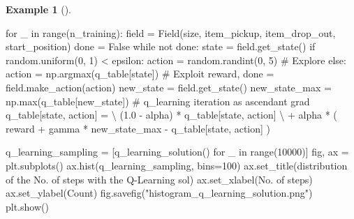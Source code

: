 \documentclass[
  letterpaper,
]{krantz}
\makeatletter
\newenvironment{Shaded}{\begin{snugshade}}{\end{snugshade}}
\newcommand{\BuiltInTok}[1]{\textcolor[rgb]{0.00,0.23,0.31}{#1}}
\newcommand{\CommentTok}[1]{\textcolor[rgb]{0.37,0.37,0.37}{#1}}
\newcommand{\ControlFlowTok}[1]{\textcolor[rgb]{0.00,0.23,0.31}{#1}}
\newcommand{\DecValTok}[1]{\textcolor[rgb]{0.68,0.00,0.00}{#1}}
\newcommand{\FloatTok}[1]{\textcolor[rgb]{0.68,0.00,0.00}{#1}}
\newcommand{\KeywordTok}[1]{\textcolor[rgb]{0.00,0.23,0.31}{#1}}
\newcommand{\NormalTok}[1]{\textcolor[rgb]{0.00,0.23,0.31}{#1}}
\newcommand{\OperatorTok}[1]{\textcolor[rgb]{0.37,0.37,0.37}{#1}}
\newcommand{\StringTok}[1]{\textcolor[rgb]{0.13,0.47,0.30}{#1}}
\newcommand{\VariableTok}[1]{\textcolor[rgb]{0.07,0.07,0.07}{#1}}
\newenvironment{kframe}{%
\medskip{}
\setlength{\fboxsep}{.8em}
 \def\at@end@of@kframe{}%
 \ifinner\ifhmode%
  \def\at@end@of@kframe{\end{minipage}}%
  \begin{minipage}{\columnwidth}%
 \fi\fi%
 \def\FrameCommand##1{\hskip\@totalleftmargin \hskip-\fboxsep
 \colorbox{shadecolor}{##1}\hskip-\fboxsep
     \hskip-\linewidth \hskip-\@totalleftmargin \hskip\columnwidth}%
 \MakeFramed {\advance\hsize-\width
   \@totalleftmargin\z@ \linewidth\hsize
   \@setminipage}}%
 {\par\unskip\endMakeFramed%
 \at@end@of@kframe}
\renewenvironment{Shaded}{\begin{kframe}}{\end{kframe}}
\theoremstyle{plain}
\theoremstyle{definition}
\newtheorem{example}{Example}[chapter]
\theoremstyle{definition}
\theoremstyle{remark}
\makeatother
\begin{document}
\begin{example}[]
\begin{tcolorbox}[enhanced jigsaw, bottomrule=.15mm, opacityback=0, breakable, colframe=quarto-callout-tip-color-frame, left=2mm, rightrule=.15mm, toprule=.15mm, leftrule=.75mm, arc=.35mm, colback=white]
\begin{codelisting}[H]
\begin{Shaded}
\begin{Highlighting}[]
\ControlFlowTok{for}\NormalTok{ \_ }\KeywordTok{in} \BuiltInTok{range}\NormalTok{(n\_training):}
\NormalTok{    field }\OperatorTok{=}\NormalTok{ Field(size, item\_pickup, item\_drop\_out, start\_position)}
\NormalTok{    done }\OperatorTok{=} \VariableTok{False}
    \ControlFlowTok{while} \KeywordTok{not}\NormalTok{ done:}
\NormalTok{        state }\OperatorTok{=}\NormalTok{ field.get\_state()}
        \ControlFlowTok{if}\NormalTok{ random.uniform(}\DecValTok{0}\NormalTok{, }\DecValTok{1}\NormalTok{) }\OperatorTok{\textless{}}\NormalTok{ epsilon:}
\NormalTok{            action }\OperatorTok{=}\NormalTok{ random.randint(}\DecValTok{0}\NormalTok{, }\DecValTok{5}\NormalTok{)  }\CommentTok{\# Explore}
        \ControlFlowTok{else}\NormalTok{:}
\NormalTok{            action }\OperatorTok{=}\NormalTok{ np.argmax(q\_table[state])  }\CommentTok{\# Exploit}
\NormalTok{        reward, done }\OperatorTok{=}\NormalTok{ field.make\_action(action)}
\NormalTok{        new\_state }\OperatorTok{=}\NormalTok{ field.get\_state()}
\NormalTok{        new\_state\_max }\OperatorTok{=}\NormalTok{ np.}\BuiltInTok{max}\NormalTok{(q\_table[new\_state])}
        \CommentTok{\# q\_learning iteration as ascendant grad}
\NormalTok{        q\_table[state, action] }\OperatorTok{=} \OperatorTok{\textbackslash{}}
\NormalTok{            (}\FloatTok{1.0} \OperatorTok{{-}}\NormalTok{ alpha) }\OperatorTok{*}\NormalTok{ q\_table[state, action] }\OperatorTok{\textbackslash{}}
            \OperatorTok{+}\NormalTok{ alpha }\OperatorTok{*}\NormalTok{ (}
\NormalTok{                reward }\OperatorTok{+}\NormalTok{ gamma }\OperatorTok{*}\NormalTok{ new\_state\_max }\OperatorTok{{-}}\NormalTok{ q\_table[state, action]}
\NormalTok{            )}

\NormalTok{q\_learning\_sampling }\OperatorTok{=}\NormalTok{ [q\_learning\_solution() }\ControlFlowTok{for}\NormalTok{ \_ }\KeywordTok{in} \BuiltInTok{range}\NormalTok{(}\DecValTok{10000}\NormalTok{)]}
\NormalTok{fig, ax }\OperatorTok{=}\NormalTok{ plt.subplots()}
\NormalTok{ax.hist(q\_learning\_sampling, bins}\OperatorTok{=}\DecValTok{100}\NormalTok{)}
\NormalTok{ax.set\_title(}\StringTok{\textquotesingle{}distribution of the No. of steps with the Q{-}Learning sol\textquotesingle{}}\NormalTok{)}
\NormalTok{ax.set\_xlabel(}\StringTok{\textquotesingle{}No. of steps\textquotesingle{}}\NormalTok{)}
\NormalTok{ax.set\_ylabel(}\StringTok{\textquotesingle{}Count\textquotesingle{}}\NormalTok{)}
\NormalTok{fig.savefig(}\StringTok{"histogram\_q\_learning\_solution.png"}\NormalTok{)}
\NormalTok{plt.show()}
\end{Highlighting}
\end{Shaded}


\end{codelisting}
\end{tcolorbox}
\end{example}
\end{document}
